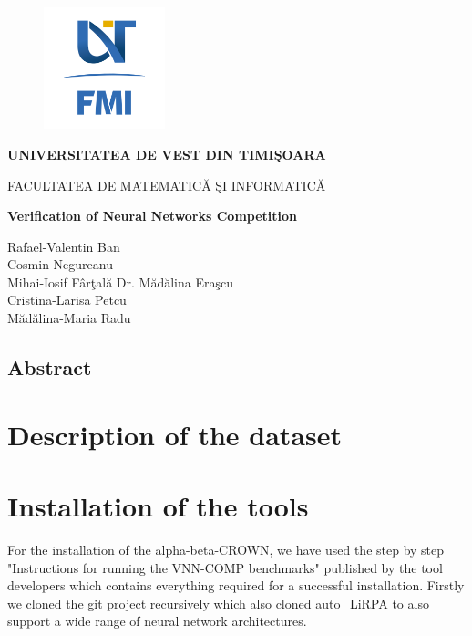\documentclass[12pt,a4paper]{report}
\newcommand\tab[1][5mm]{\hspace*{#1}}
\theoremstyle{definition}
\theoremstyle{remark}
\begin{document}
\thispagestyle{empty}
\begin{center}
\begin{figure}[h!]
\vspace{-20pt}
\begin{center}
\includegraphics[width=100pt]{FMI-03.png}
\end{center}
\end{figure}

{\large{\bf UNIVERSITATEA DE VEST DIN TIMI\c SOARA

FACULTATEA DE MATEMATIC\u A \c SI INFORMATIC\u A}}

\vspace{65pt}
{\huge {\bf Verification of Neural Networks Competition}}

\vspace{65pt}
\end{center}

\noindent Rafael-Valentin Ban\\
\noindent Cosmin Negureanu\\
\noindent Mihai-Iosif F\^{a}r\c tal\u a \hfill Dr. M\u ad\u alina Era\c scu\\
\noindent Cristina-Larisa Petcu\\
\noindent M\u ad\u alina-Maria Radu\\

\vspace{65pt}
\section*{Abstract}
\tableofcontents

\chapter{Description of the dataset}
\chapter{Installation of the tools}
\tab For the installation of the alpha-beta-CROWN, we have used the step by step "Instructions for running the VNN-COMP benchmarks"\cite{alpha-beta-instructions} published by the tool developers which contains everything required for a successful installation. Firstly we cloned the git project recursively which also cloned auto\_LiRPA\cite{auto_lirpa_repo} to also support a wide range of neural network architectures.
\end{document}
